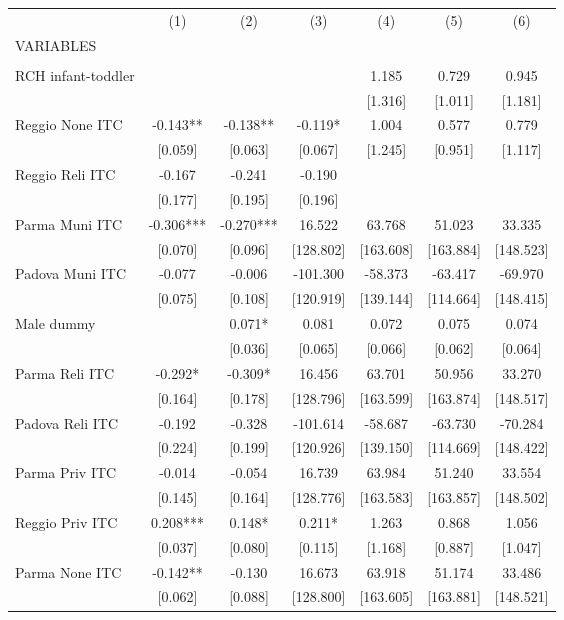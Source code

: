 \begin{tabular}{lcccccc} \hline
 & (1) & (2) & (3) & (4) & (5) & (6) \\
VARIABLES &  &  &  &  &  &  \\ \hline
 &  &  &  &  &  &  \\
RCH infant-toddler &  &  &  & 1.185 & 0.729 & 0.945 \\
 &  &  &  & [1.316] & [1.011] & [1.181] \\
Reggio None ITC & -0.143** & -0.138** & -0.119* & 1.004 & 0.577 & 0.779 \\
 & [0.059] & [0.063] & [0.067] & [1.245] & [0.951] & [1.117] \\
Reggio Reli ITC & -0.167 & -0.241 & -0.190 &  &  &  \\
 & [0.177] & [0.195] & [0.196] &  &  &  \\
Parma Muni ITC & -0.306*** & -0.270*** & 16.522 & 63.768 & 51.023 & 33.335 \\
 & [0.070] & [0.096] & [128.802] & [163.608] & [163.884] & [148.523] \\
Padova Muni ITC & -0.077 & -0.006 & -101.300 & -58.373 & -63.417 & -69.970 \\
 & [0.075] & [0.108] & [120.919] & [139.144] & [114.664] & [148.415] \\
Male dummy &  & 0.071* & 0.081 & 0.072 & 0.075 & 0.074 \\
 &  & [0.036] & [0.065] & [0.066] & [0.062] & [0.064] \\
Parma Reli ITC & -0.292* & -0.309* & 16.456 & 63.701 & 50.956 & 33.270 \\
 & [0.164] & [0.178] & [128.796] & [163.599] & [163.874] & [148.517] \\
Padova Reli ITC & -0.192 & -0.328 & -101.614 & -58.687 & -63.730 & -70.284 \\
 & [0.224] & [0.199] & [120.926] & [139.150] & [114.669] & [148.422] \\
Parma Priv ITC & -0.014 & -0.054 & 16.739 & 63.984 & 51.240 & 33.554 \\
 & [0.145] & [0.164] & [128.776] & [163.583] & [163.857] & [148.502] \\
Reggio Priv ITC & 0.208*** & 0.148* & 0.211* & 1.263 & 0.868 & 1.056 \\
 & [0.037] & [0.080] & [0.115] & [1.168] & [0.887] & [1.047] \\
Parma None ITC & -0.142** & -0.130 & 16.673 & 63.918 & 51.174 & 33.486 \\
 & [0.062] & [0.088] & [128.800] & [163.605] & [163.881] & [148.521] \\

\end{tabular}
